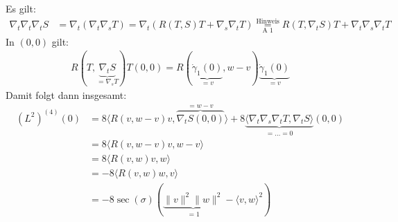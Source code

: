 \begin{Loes}
\begin{align*}
\end{align*}
Es gilt:
\begin{align*}
	\nabla_t\nabla_t\nabla_t S &= \nabla_t (\nabla_t \nabla_s T) = \nabla_t (R(T,S)T + \nabla_s \nabla_t T) \overset{\text{Hinweis}}{\underset{\text{A 1}}{=}} R(T, \nabla_t S) T + \nabla_t \nabla_s \nabla_t T
\end{align*}
In $(0,0)$ gilt:
\begin{align*}
	R (T, \underbrace{\nabla_t S}_{= \nabla_s T}) T (0,0) = R(\underbrace{\dot\gamma_1(0)}_{=v}, w - v) \underbrace{\dot\gamma_1(0)}_{=v}
\end{align*}
Damit folgt dann insgesamt:
\begin{align*}
	(L^2)^{(4)}(0) &= 8 \langle R(v, w - v) v, \overbrace{\nabla_t S(0,0)}^{=w-v} \rangle + 8 \underbrace{\langle \nabla_t\nabla_s\nabla_t T, \nabla_t S \rangle}_{= \ldots = 0} (0,0) \\
	&= 8 \langle R(v, w - v) v, w - v \rangle \\
	&= 8 \langle R(v, w) v, w \rangle \\
	&= -8 \langle R(v, w) w, v \rangle \\
	&= -8 \sec(\sigma) (\underbrace{\|v\|^2 \|w\|^2}_{=1} - \langle v, w \rangle^2)
\end{align*}

\end{Loes}